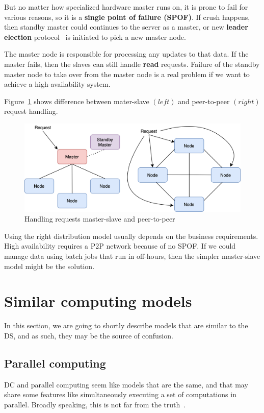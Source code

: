 But no matter how specialized hardware master runs on, it is prone to fail for various reasons, so it is a \textbf{single point of failure (SPOF)}. If crush happens, then standby master could continues to the server as a master, or new \textbf{leader election} protocol~\cite{KorachKM90} is initiated to pick a new master node. 

The master node is responsible for processing any updates to that data. If the master fails, then the slaves can still handle \textbf{read} requests. Failure of the standby master node to take over from the master node is a real problem if we want to achieve a high-availability system.

Figure~\ref{fig:fig16} shows difference between mater-slave $(left)$ and peer-to-peer $(right)$ request handling.

\begin{figure}[H]
	\begin{center}
		\includegraphics[scale=0.7]{images/Figure16.png}
	\end{center}
	\vspace{-0.6cm}
	\caption{Handling requests master-slave and peer-to-peer}
	\label{fig:fig16}
\end{figure}

\noindent
Using the right distribution model usually depends on the business requirements. High availability requires a P2P network because of no SPOF. If we could manage data using batch jobs that run in off-hours, then the simpler master-slave model might be the solution.
%
%
\section{Similar computing models}\label{sec:similar_models}
%
In this section, we are going to shortly describe models that are similar to the DS, and as such, they may be the source of confusion.
%
%
\subsection{Parallel computing}\label{sec:parallel_computing}
%
DC and parallel computing seem like models that are the same, and that may share some features like simultaneously executing a set of computations in parallel. Broadly speaking, this is not far from the truth~\cite{Vera16}. 

